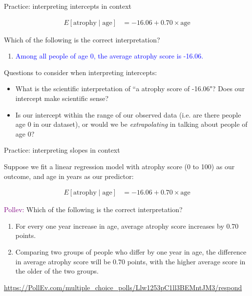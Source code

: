 \documentclass[10pt,t]{beamer}
\begin{document}
\begin{frame}{Practice: interpreting intercepts in context}


\begin{align*}
E[\text{atrophy} \mid \text{age}] & = -16.06 + 0.70 \times \text{age}
\end{align*}

Which of the following is the correct interpretation?

\vspace{0.3cm}

\begin{enumerate}
	\item[] \textcolor{blue}{Among all people of age $0$, the average atrophy score is -16.06.}
\end{enumerate}

Questions to consider when interpreting intercepts:

\begin{itemize}
	\item What is the scientific interpretation of ``a atrophy score of -16.06"? Does our intercept make scientific sense?
	\item Is our intercept within the range of our observed data (i.e. are there people age $0$ in our dataset), or would we be \textit{extrapolating} in talking about people of age $0$?
\end{itemize}

\end{frame}

\begin{frame}{Practice: interpreting slopes in context}

Suppose we fit a linear regression model with atrophy score (0 to 100) as our outcome, and age in years as our predictor:

\begin{align*}
E[\text{atrophy} \mid \text{age}] & = -16.06 + 0.70 \times \text{age}
\end{align*}


\textcolor{purple}{Pollev:} Which of the following is the correct interpretation?

\begin{enumerate}
	\item For every one year increase in age, average atrophy score increases by 0.70 points.
	\item Comparing two groups of people who differ by one year in age, the difference in average atrophy score will be 0.70 points, with the higher average score in the older of the two groups.
\end{enumerate}
\medskip

\url{https://PollEv.com/multiple_choice_polls/Llw1253pC1ll3BEMntJM3/respond}

\end{frame}
\end{document}
